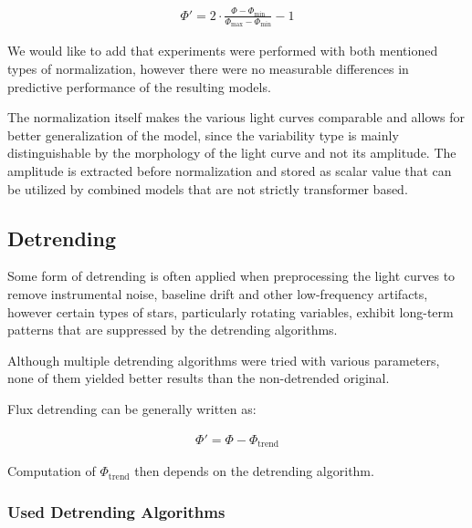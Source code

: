 \begin{align}
    \Phi' = 2 \cdot \frac{\Phi - \Phi_{\min}}{\Phi_{\max} - \Phi_{\min}} - 1
\end{align}

We would like to add that experiments were performed with both mentioned types of normalization, however there were no measurable differences in predictive performance of the resulting models.

The normalization itself makes the various light curves comparable and allows for better generalization of the model, since the variability type is mainly distinguishable by the morphology of the light curve and not its amplitude.
The amplitude is extracted before normalization and stored as scalar value that can be utilized by combined models that are not strictly transformer based.

\subsection{Detrending}

Some form of detrending is often applied when preprocessing the light curves to remove instrumental noise, baseline drift and other low-frequency artifacts, however certain types of stars, particularly rotating variables, exhibit long-term patterns that are suppressed by the detrending algorithms.

Although multiple detrending algorithms were tried with various parameters, none of them yielded better results than the non-detrended original.

Flux detrending can be generally written as:

\begin{align}
    \Phi' = \Phi - \Phi_{\mathrm{trend}}
\end{align}

Computation of $\Phi_{\mathrm{trend}}$ then depends on the detrending algorithm.

\subsubsection{Used Detrending Algorithms}

